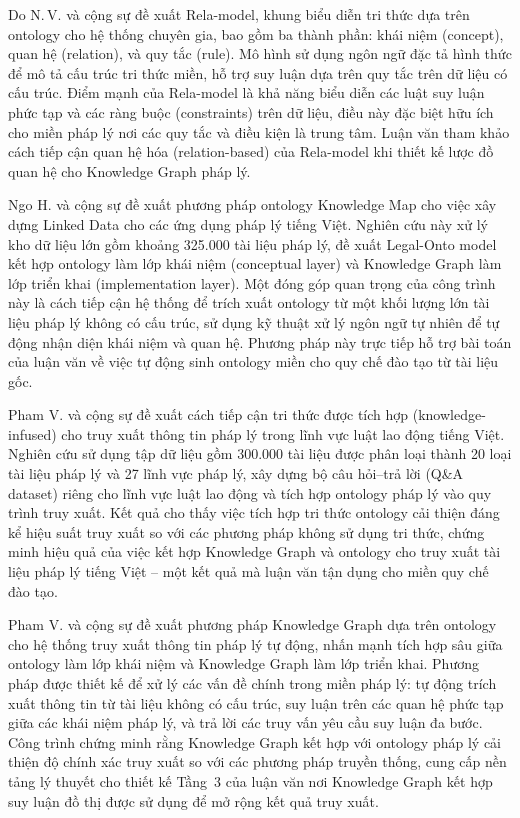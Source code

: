 Do N.\,V. và cộng sự \cite{do2018rela} đề xuất Rela-model, khung biểu diễn tri thức dựa
trên ontology cho hệ thống chuyên gia, bao gồm ba thành phần: khái niệm (concept),
quan hệ (relation), và quy tắc (rule). Mô hình sử dụng ngôn ngữ đặc tả hình thức
để mô tả cấu trúc tri thức miền, hỗ trợ suy luận dựa trên quy tắc trên dữ liệu
có cấu trúc. Điểm mạnh của Rela-model là khả năng biểu diễn các luật suy luận phức
tạp và các ràng buộc (constraints) trên dữ liệu, điều này đặc biệt hữu ích cho
miền pháp lý nơi các quy tắc và điều kiện là trung tâm. Luận văn tham khảo cách
tiếp cận quan hệ hóa (relation-based) của Rela-model khi thiết kế lược đồ quan hệ
cho Knowledge Graph pháp lý.

Ngo H. và cộng sự \cite{ngo2024ontology} đề xuất phương pháp ontology Knowledge Map
cho việc xây dựng Linked Data cho các ứng dụng pháp lý tiếng Việt. Nghiên cứu này
xử lý kho dữ liệu lớn gồm khoảng 325.000 tài liệu pháp lý, đề xuất Legal-Onto
model kết hợp ontology làm lớp khái niệm (conceptual layer) và Knowledge Graph làm
lớp triển khai (implementation layer). Một đóng góp quan trọng của công trình này là
cách tiếp cận hệ thống để trích xuất ontology từ một khối lượng lớn tài liệu pháp
lý không có cấu trúc, sử dụng kỹ thuật xử lý ngôn ngữ tự nhiên để tự động nhận
diện khái niệm và quan hệ. Phương pháp này trực tiếp hỗ trợ bài toán của luận văn
về việc tự động sinh ontology miền cho quy chế đào tạo từ tài liệu gốc.

Pham V. và cộng sự \cite{pham2024enhancing} đề xuất cách tiếp cận tri thức được tích
hợp (knowledge-infused) cho truy xuất thông tin pháp lý trong lĩnh vực luật lao động
tiếng Việt. Nghiên cứu sử dụng tập dữ liệu gồm 300.000 tài liệu được phân loại
thành 20 loại tài liệu pháp lý và 27 lĩnh vực pháp lý, xây dựng bộ câu hỏi--trả
lời (Q\&A dataset) riêng cho lĩnh vực luật lao động và tích hợp ontology pháp lý
vào quy trình truy xuất. Kết quả cho thấy việc tích hợp tri thức ontology cải thiện
đáng kể hiệu suất truy xuất so với các phương pháp không sử dụng tri thức, chứng
minh hiệu quả của việc kết hợp Knowledge Graph và ontology cho truy xuất tài liệu
pháp lý tiếng Việt -- một kết quả mà luận văn tận dụng cho miền quy chế đào tạo.

Pham V. và cộng sự \cite{pham2026ontology} đề xuất phương pháp Knowledge Graph dựa
trên ontology cho hệ thống truy xuất thông tin pháp lý tự động, nhấn mạnh tích hợp
sâu giữa ontology làm lớp khái niệm và Knowledge Graph làm lớp triển khai. Phương
pháp được thiết kế để xử lý các vấn đề chính trong miền pháp lý: tự động trích xuất
thông tin từ tài liệu không có cấu trúc, suy luận trên các quan hệ phức tạp giữa
các khái niệm pháp lý, và trả lời các truy vấn yêu cầu suy luận đa bước. Công
trình chứng minh rằng Knowledge Graph kết hợp với ontology pháp lý cải thiện độ
chính xác truy xuất so với các phương pháp truyền thống, cung cấp nền tảng lý thuyết
cho thiết kế Tầng~3 của luận văn nơi Knowledge Graph kết hợp suy luận đồ thị được
sử dụng để mở rộng kết quả truy xuất.

